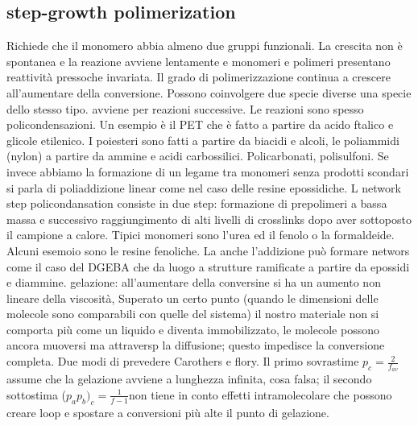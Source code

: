     \subsection{step-growth polimerization}
    Richiede che il monomero abbia almeno due gruppi funzionali.
    La crescita non è spontanea e la reazione avviene lentamente e monomeri e polimeri presentano reattività pressoche invariata. Il grado di polimerizzazione continua a crescere all'aumentare della conversione. Possono coinvolgere due specie diverse  una specie dello stesso tipo. avviene per reazioni successive. Le reazioni sono spesso policondensazioni. Un esempio è il PET che è fatto a partire da acido ftalico e glicole etilenico. I poiesteri sono fatti a partire da biacidi e alcoli, le poliammidi (nylon) a partire da ammine e acidi carbossilici. Policarbonati, polisulfoni. Se invece abbiamo la formazione di un legame tra monomeri senza prodotti scondari si parla di poliaddizione linear come nel caso delle resine epossidiche. L network step policondansation consiste in due step:
    formazione di prepolimeri a bassa massa e successivo raggiungimento di alti livelli di crosslinks dopo aver sottoposto il campione a calore. Tipici monomeri sono l'urea ed il fenolo o la formaldeide. Alcuni esemoio sono le resine fenoliche. La anche l'addizione può formare networs come il caso del DGEBA che da luogo a strutture ramificate a partire da epossidi e diammine. gelazione: all'aumentare della conversine si ha un aumento non lineare della viscosità, Superato un certo punto (quando le dimensioni delle molecole sono comparabili con quelle del sistema) il nostro materiale non si comporta più come un liquido e diventa immobilizzato, le molecole possono ancora muoversi ma attraversp la diffusione; questo impedisce la conversione completa. Due modi di prevedere Carothers e flory. Il primo sovrastime $p_c=\frac{
    2
    }{f_{av}}$ assume che la gelazione avviene a lunghezza infinita, cosa falsa; il secondo sottostima ($p_ap_b)_c=\frac{1}{f-1}$non tiene in conto effetti intramolecolare che possono creare loop e spostare a conversioni più alte il punto di gelazione.
